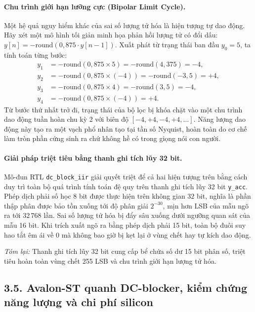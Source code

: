 \paragraph{Chu trình giới hạn lưỡng cực (Bipolar Limit Cycle).}
Một hệ quả nguy hiểm khác của sai số lượng tử hóa là hiện tượng tự dao động. Hãy xét một mô hình tối giản minh họa phản hồi lượng tử có đổi dấu: $y[n] = -\mathrm{round}(0{,}875\cdot y[n-1])$. Xuất phát từ trạng thái ban đầu $y_0 = 5$, ta tính toán từng bước:
\begin{align*}
y_1 &= -\mathrm{round}(0{,}875 \times 5) = -\mathrm{round}(4{,}375) = -4,\\
y_2 &= -\mathrm{round}(0{,}875 \times (-4)) = -\mathrm{round}(-3{,}5) = +4,\\
y_3 &= -\mathrm{round}(0{,}875 \times 4) = -\mathrm{round}(3{,}5) = -4,\\
y_4 &= -\mathrm{round}(0{,}875 \times (-4)) = +4.
\end{align*}
Từ bước thứ nhất trở đi, trạng thái của bộ lọc bị khóa chặt vào một chu trình dao động tuần hoàn chu kỳ 2 với biên độ $[-4, +4, -4, +4, \ldots]$. Năng lượng dao động này tạo ra một vạch phổ nhân tạo tại tần số Nyquist, hoàn toàn do cơ chế làm tròn phần cứng sinh ra chứ không hề có trong giọng nói con người.

\paragraph{Giải pháp triệt tiêu bằng thanh ghi tích lũy 32 bit.}
Mô-đun RTL \texttt{dc\_block\_iir} giải quyết triệt để cả hai hiện tượng trên bằng cách duy trì toàn bộ quá trình tính toán đệ quy trên thanh ghi tích lũy 32 bit \texttt{y\_acc}. Phép dịch phải số học $8$ bit được thực hiện trên không gian $32$ bit, nghĩa là phần thập phân được bảo tồn xuống tới độ phân giải $2^{-30}$, mịn hơn LSB của mẫu ngõ ra tới $32\,768$ lần. Sai số lượng tử hóa bị đẩy sâu xuống dưới ngưỡng quan sát của mẫu 16 bit. Khi trích xuất ngõ ra bằng phép dịch phải 15 bit, toàn bộ đuôi suy hao tắt êm ái về 0 mà không bao giờ bị kẹt lại ở vùng chết hay tự kích dao động.

\textit{Tóm lại:} Thanh ghi tích lũy 32 bit cung cấp bể chứa số dư 15 bit phân số, triệt tiêu hoàn toàn vùng chết 255 LSB và chu trình giới hạn lượng tử hóa.

\subsection*{3.5. Avalon-ST quanh DC-blocker, kiểm chứng năng lượng và chi phí silicon}

